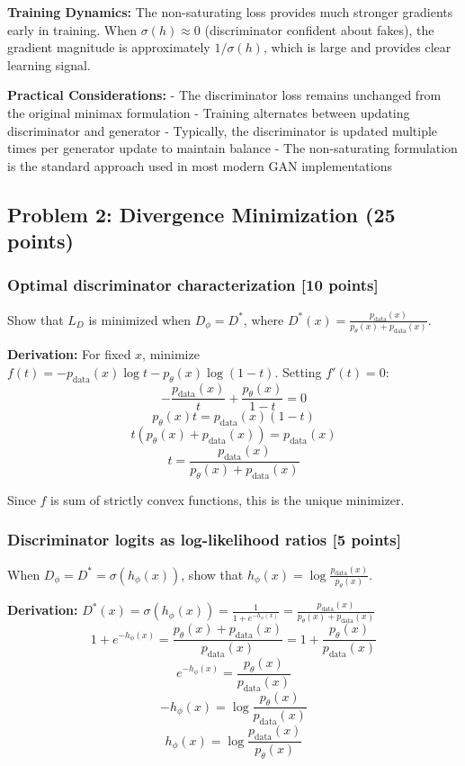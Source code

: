 \documentclass{article}
\begin{document}
\textbf{Training Dynamics:} The non-saturating loss provides much stronger gradients early in training. When $\sigma(h) \approx 0$ (discriminator confident about fakes), the gradient magnitude is approximately $1/\sigma(h)$, which is large and provides clear learning signal.

\textbf{Practical Considerations:}
- The discriminator loss remains unchanged from the original minimax formulation
- Training alternates between updating discriminator and generator
- Typically, the discriminator is updated multiple times per generator update to maintain balance
- The non-saturating formulation is the standard approach used in most modern GAN implementations

\subsection{Problem 2: Divergence Minimization (25 points)}

\subsubsection{Optimal discriminator characterization [10 points]}
Show that $L_D$ is minimized when $D_\phi = D^*$, where $D^*(x) = \frac{p_{\text{data}}(x)}{p_\theta(x) + p_{\text{data}}(x)}$.

\textbf{Derivation:} For fixed $x$, minimize $f(t) = -p_{\text{data}}(x) \log t - p_\theta(x) \log(1-t)$. Setting $f'(t) = 0$:
\[
-\frac{p_{\text{data}}(x)}{t} + \frac{p_\theta(x)}{1-t} = 0
\]
\[
p_\theta(x) t = p_{\text{data}}(x) (1-t)
\]
\[
t(p_\theta(x) + p_{\text{data}}(x)) = p_{\text{data}}(x)
\]
\[
t = \frac{p_{\text{data}}(x)}{p_\theta(x) + p_{\text{data}}(x)}
\]

Since $f$ is sum of strictly convex functions, this is the unique minimizer.

\subsubsection{Discriminator logits as log-likelihood ratios [5 points]}
When $D_\phi = D^* = \sigma(h_\phi(x))$, show that $h_\phi(x) = \log \frac{p_{\text{data}}(x)}{p_\theta(x)}$.

\textbf{Derivation:} $D^*(x) = \sigma(h_\phi(x)) = \frac{1}{1 + e^{-h_\phi(x)}} = \frac{p_{\text{data}}(x)}{p_\theta(x) + p_{\text{data}}(x)}$
\[
1 + e^{-h_\phi(x)} = \frac{p_\theta(x) + p_{\text{data}}(x)}{p_{\text{data}}(x)} = 1 + \frac{p_\theta(x)}{p_{\text{data}}(x)}
\]
\[
e^{-h_\phi(x)} = \frac{p_\theta(x)}{p_{\text{data}}(x)}
\]
\[
-h_\phi(x) = \log \frac{p_\theta(x)}{p_{\text{data}}(x)}
\]
\[
h_\phi(x) = \log \frac{p_{\text{data}}(x)}{p_\theta(x)}
\]
\end{document}
